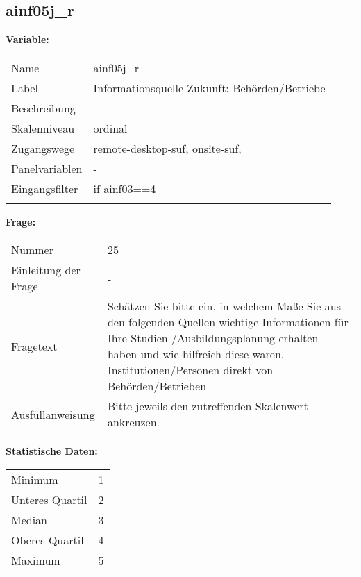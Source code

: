 	
	
	\subsection{ainf05j\_r}
	\label{subSection:ainf05j_r}

	\noindent\textbf{Variable:}\\
		\begin{tabular}{lL{11.3cm}}
			\label{tableVariable:ainf05j_r}
			Name & ainf05j\_r \\
			Label & Informationsquelle Zukunft: Behörden/Betriebe \\
			Beschreibung & - \\
			Skalenniveau & ordinal \\
			Zugangswege &
				remote-desktop-suf,
				onsite-suf,
 \\
			Panelvariablen & -
			 \\
			Eingangsfilter & if ainf03==4 \\
 \\
		\end{tabular}

		\vspace*{1 cm}
		\noindent\textbf{Frage:}\\
		\begin{tabular}{lL{11.3cm}}
			\label{tableQuestion:ainf05j_r}
			Nummer & 25 \\
			Einleitung der Frage & - \\
			Fragetext & Schätzen Sie bitte ein, in welchem Maße Sie aus den folgenden Quellen wichtige Informationen für Ihre Studien-/Ausbildungsplanung erhalten haben und wie hilfreich diese waren.
Institutionen/Personen
direkt von Behörden/Betrieben \\
			Ausfüllanweisung & Bitte jeweils den zutreffenden Skalenwert ankreuzen. \\
		\end{tabular}


		\vspace*{1 cm}
		\noindent\textbf{Statistische Daten:}\\
			\begin{tabular}{ll}
				\label{tableStatistics:ainf05j_r}
					Minimum & 1 \\
					Unteres Quartil & 2 \\
					Median & 3 \\
					Oberes Quartil & 4 \\
					Maximum & 5 \\
			\end{tabular}




